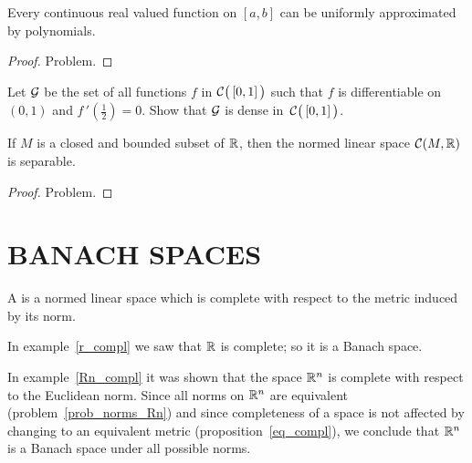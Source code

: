 \begin{thm}\label{Wat}
Every continuous real valued function on $[a,b]$ can be uniformly approximated by polynomials.
\end{thm}

\begin{proof} Problem.  \ns  \end{proof}

\begin{prob} Let $\mathcal{G}$ be the set of all functions $f$ in $\mathcal{C}\bigl(\,[0,1]\,\bigr)$
such that $f$ is differentiable on $(0,1)$ and $f\,'(\frac12) = 0$. Show that $\mathcal{G}$ is
dense in~$\mathcal{C}\bigl(\,[0,1]\,\bigr)$.
\end{prob}

\begin{prop} If $M$ is a closed and bounded subset of $\mathbb{R}$, then the normed linear space
$\mathcal{C}(M,\mathbb{R})$ is separable.
\end{prop}

\begin{proof} Problem.  \ns  \end{proof}















\section{BANACH SPACES}

\begin{defn} A
 is a normed linear space which is complete with respect to the metric
induced by its norm.
\end{defn}

\begin{exam} In example~\ref{r_compl} we saw that $\mathbb{R}$ is complete; so it is a Banach space.
\end{exam}

\begin{exam} In example~\ref{Rn_compl} it was shown that the space $\mathbb{R}^n$ is complete with
respect to the Euclidean norm.  Since all norms on $\mathbb{R}^n$ are equivalent
(problem~\ref{prob_norms_Rn}) and since completeness of a space is not affected by changing to
an equivalent metric (proposition~\ref{eq_compl}), we conclude that $\mathbb{R}^n$ is a Banach space
under all possible norms.
\end{exam}

